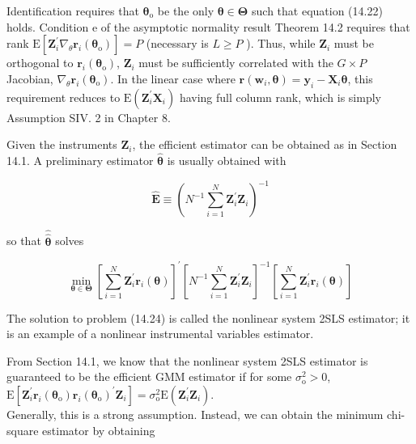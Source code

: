 \documentclass[10pt]{article}
\begin{document}
Identification requires that $\boldsymbol{\theta}_{\mathrm{o}}$ be the only $\boldsymbol{\theta} \in \boldsymbol{\Theta}$ such that equation (14.22) holds. Condition e of the asymptotic normality result Theorem 14.2 requires that rank $\mathrm{E}\left[\mathbf{Z}_{i}^{\prime} \nabla_{\theta} \mathbf{r}_{i}\left(\boldsymbol{\theta}_{\mathrm{o}}\right)\right]=P$ (necessary is $L \geq P$ ). Thus, while $\mathbf{Z}_{i}$ must be orthogonal to $\mathbf{r}_{i}\left(\boldsymbol{\theta}_{\mathrm{o}}\right)$, $\mathbf{Z}_{i}$ must be sufficiently correlated with the $G \times P$ Jacobian, $\nabla_{\theta} \mathbf{r}_{i}\left(\boldsymbol{\theta}_{\mathrm{o}}\right)$. In the linear case where $\mathbf{r}\left(\mathbf{w}_{i}, \boldsymbol{\theta}\right)=\mathbf{y}_{i}-\mathbf{X}_{i} \boldsymbol{\theta}$, this requirement reduces to $\mathrm{E}\left(\mathbf{Z}_{i}^{\prime} \mathbf{X}_{i}\right)$ having full column rank, which is simply Assumption SIV. 2 in Chapter 8.

Given the instruments $\mathbf{Z}_{i}$, the efficient estimator can be obtained as in Section 14.1. A preliminary estimator $\hat{\boldsymbol{\theta}}$ is usually obtained with


\begin{equation*}
\hat{\boldsymbol{E}} \equiv\left(N^{-1} \sum_{i=1}^{N} \mathbf{Z}_{i}^{\prime} \mathbf{Z}_{i}\right)^{-1} \tag{14.23}
\end{equation*}


so that $\hat{\hat{\boldsymbol{\theta}}}$ solves


\begin{equation*}
\min _{\boldsymbol{\theta} \in \boldsymbol{\Theta}}\left[\sum_{i=1}^{N} \mathbf{Z}_{i}^{\prime} \mathbf{r}_{i}(\boldsymbol{\theta})\right]^{\prime}\left[N^{-1} \sum_{i=1}^{N} \mathbf{Z}_{i}^{\prime} \mathbf{Z}_{i}\right]^{-1}\left[\sum_{i=1}^{N} \mathbf{Z}_{i}^{\prime} \mathbf{r}_{i}(\boldsymbol{\theta})\right] \tag{14.24}
\end{equation*}


The solution to problem (14.24) is called the nonlinear system 2SLS estimator; it is an example of a nonlinear instrumental variables estimator.

From Section 14.1, we know that the nonlinear system 2SLS estimator is guaranteed to be the efficient GMM estimator if for some $\sigma_{\mathrm{o}}^{2}>0$,\\
$\mathrm{E}\left[\mathbf{Z}_{i}^{\prime} \mathbf{r}_{i}\left(\boldsymbol{\theta}_{\mathrm{o}}\right) \mathbf{r}_{i}\left(\boldsymbol{\theta}_{\mathrm{o}}\right)^{\prime} \mathbf{Z}_{i}\right]=\sigma_{\mathrm{o}}^{2} \mathrm{E}\left(\mathbf{Z}_{i}^{\prime} \mathbf{Z}_{i}\right)$.\\
Generally, this is a strong assumption. Instead, we can obtain the minimum chi-square estimator by obtaining
\end{document}
